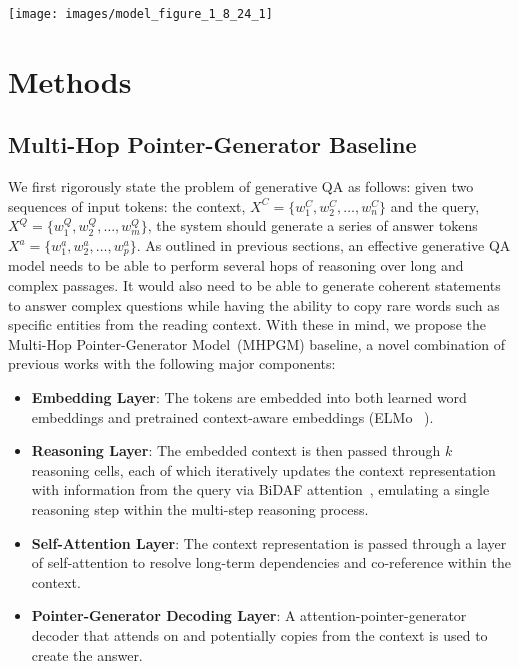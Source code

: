 \documentclass[11pt,a4paper]{article}
\newcommand{\baseline}{Multi-Hop Pointer-Generator Model}
\newcommand{\baselineAbbv}{MHPGM}
\newcommand{\fullModel}{NOIC}
\begin{document}
\begin{figure*}[t] 
	\centering
    \texttt{[image: images/model\_figure\_1\_8\_24\_1]}
    \vspace{-10pt}
    \caption{Architecture for our \baseline, and the \fullModel\ commonsense reasoning cell.
        \label{fig:model_figure}
        \vspace{-5pt}
    }
\end{figure*}


 \section{Methods}
\label{sec:methods}

\subsection{Multi-Hop Pointer-Generator Baseline}
\label{sec:models}

We first rigorously state the problem of generative QA as follows: given two sequences of input tokens: the context, $X^C = \{w_1^C, w_2^C, \dots, w_n^C\}$ and the query, $X^Q = \{w_1^Q, w_2^Q, \dots, w_m^Q\}$, the system should generate a series of answer tokens $X^a = \{w_1^a, w_2^a, \dots, w_p^a\}$.
As outlined in previous sections, an effective generative QA model needs to be able to perform several hops of reasoning over long and complex passages.
It would also need to be able to generate coherent statements to answer complex questions while having the ability to copy rare words such as specific entities from the reading context.
With these in mind, we propose the \baseline\ (\baselineAbbv) baseline, a novel combination of previous works with the following major components:
\begin{itemize}[leftmargin=*]
    \setlength\itemsep{-0.45em}
    \item \textbf{Embedding Layer}: The tokens are embedded into both learned word embeddings and pretrained context-aware embeddings (ELMo ~\cite{peters2018deep}).
    \item \textbf{Reasoning Layer}: The embedded context is then passed through $k$ reasoning cells, each of which iteratively updates the context representation with information from the query via BiDAF attention~\cite{seo2016bidirectional}, emulating a single reasoning step within the multi-step reasoning process.
    \item \textbf{Self-Attention Layer}: The context representation is passed through a layer of self-attention \cite{cheng2016long} to resolve long-term dependencies and co-reference within the context.
    \item \textbf{Pointer-Generator Decoding Layer}: A attention-pointer-generator decoder \cite{see2017get} that attends on and potentially copies from the context is used to create the answer.
\end{itemize}
\end{document}
